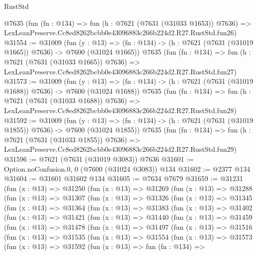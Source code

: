 \begin{lexlean}{RustStd}
\begin{coremodule}
    @7635
    (fun (fn : @134) =>
    fun (h : @7621 (@7631 (@31033 @1653)) @7636) =>
    LexLeanPreserve.Cc8ed8262bcbb0e43096883c266b224d2.R27.RustStd.fun26)
@31554 := @31009
    (fun (y : @13) =>
    (fn : @134) -> (h : @7621 (@7631 (@31019 @1665)) @7636) -> @7600 (@31024 @1665))
    @7635
    (fun (fn : @134) =>
    fun (h : @7621 (@7631 (@31033 @1665)) @7636) =>
    LexLeanPreserve.Cc8ed8262bcbb0e43096883c266b224d2.R27.RustStd.fun27)
@31573 := @31009
    (fun (y : @13) =>
    (fn : @134) -> (h : @7621 (@7631 (@31019 @1688)) @7636) -> @7600 (@31024 @1688))
    @7635
    (fun (fn : @134) =>
    fun (h : @7621 (@7631 (@31033 @1688)) @7636) =>
    LexLeanPreserve.Cc8ed8262bcbb0e43096883c266b224d2.R27.RustStd.fun28)
@31592 := @31009
    (fun (y : @13) =>
    (fn : @134) -> (h : @7621 (@7631 (@31019 @1855)) @7636) -> @7600 (@31024 @1855))
    @7635
    (fun (fn : @134) =>
    fun (h : @7621 (@7631 (@31033 @1855)) @7636) =>
    LexLeanPreserve.Cc8ed8262bcbb0e43096883c266b224d2.R27.RustStd.fun29)
@31596 := @7621 (@7631 (@31019 @3083)) @7636
@31601 := Option.noConfusion.{0, 0} (@7600 (@31024 @3083)) @134
@31602 := @2377 @134
@31604 := @31601 @31602 @134
@31605 := @7634 @7679
@31659 := @31231
    (fun (x : @13) =>
    @31250
      (fun (x : @13) =>
      @31269
        (fun (x : @13) =>
        @31288
          (fun (x : @13) =>
          @31307
            (fun (x : @13) =>
            @31326
              (fun (x : @13) =>
              @31345
                (fun (x : @13) =>
                @31364
                  (fun (x : @13) =>
                  @31383
                    (fun (x : @13) =>
                    @31402
                      (fun (x : @13) =>
                      @31421
                        (fun (x : @13) =>
                        @31440
                          (fun (x : @13) =>
                          @31459
                            (fun (x : @13) =>
                            @31478
                              (fun (x : @13) =>
                              @31497
                                (fun (x : @13) =>
                                @31516
                                  (fun (x : @13) =>
                                  @31535
                                    (fun (x : @13) =>
                                    @31554
                                      (fun (x : @13) =>
                                      @31573
                                        (fun (x : @13) =>
                                        @31592
                                          (fun (x : @13) =>
                                          fun (fn : @134) =>

\end{coremodule}
\end{lexlean}
